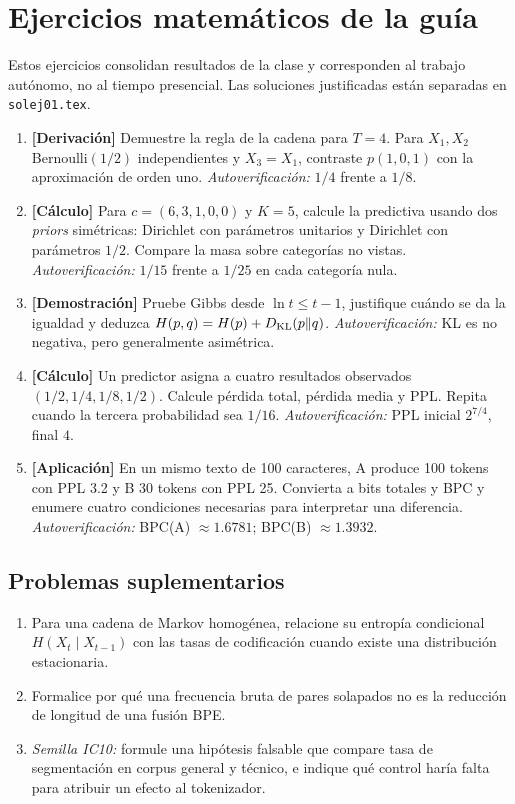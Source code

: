 \chapter*{Ejercicios matemáticos de la guía}
\noindent Estos ejercicios consolidan resultados de la clase y corresponden al
trabajo autónomo, no al tiempo presencial. Las soluciones justificadas están
separadas en \texttt{solej01.tex}.
\begin{enumerate}
\item \textbf{[Derivación]} Demuestre la regla de la cadena para $T=4$.
Para $X_1,X_2$ Bernoulli$(1/2)$ independientes y $X_3=X_1$,
contraste $p(1,0,1)$ con la aproximación de orden uno.
\emph{Autoverificación:} $1/4$ frente a $1/8$.
\item \textbf{[Cálculo]} Para $c=(6,3,1,0,0)$ y $K=5$,
calcule la predictiva usando dos \emph{priors} simétricas:
Dirichlet con parámetros unitarios y Dirichlet con parámetros $1/2$.
Compare la masa sobre categorías no vistas.
\emph{Autoverificación:} $1/15$ frente a $1/25$ en cada categoría nula.
\item \textbf{[Demostración]} Pruebe Gibbs desde $\ln t\le t-1$,
justifique cuándo se da la igualdad y deduzca
$H(p,q)=H(p)+D_{\rm KL}(p\|q)$.
\emph{Autoverificación:} KL es no negativa, pero generalmente asimétrica.
\item \textbf{[Cálculo]} Un predictor asigna a cuatro resultados observados
$(1/2,1/4,1/8,1/2)$. Calcule pérdida total, pérdida media y
PPL. Repita cuando la tercera probabilidad sea $1/16$.
\emph{Autoverificación:} PPL inicial $2^{7/4}$, final $4$.
\item \textbf{[Aplicación]} En un mismo texto de 100 caracteres, A
produce 100 tokens con PPL 3.2 y B 30 tokens con PPL 25.
Convierta a bits totales y BPC y enumere cuatro condiciones necesarias
para interpretar una diferencia.
\emph{Autoverificación:} BPC(A) $\approx1.6781$;
BPC(B) $\approx1.3932$.
\end{enumerate}
\section*{Problemas suplementarios}
\begin{enumerate}
\item[(S1.A)] Para una cadena de Markov homogénea, relacione su
entropía condicional $H(X_t\mid X_{t-1})$ con las tasas de
codificación cuando existe una distribución estacionaria.
\item[(S1.B)] Formalice por qué una frecuencia bruta de pares solapados
no es la reducción de longitud de una fusión BPE.
\item[(S1.C)] \emph{Semilla IC10:} formule una hipótesis falsable que
compare tasa de segmentación en corpus general y técnico, e indique
qué control haría falta para atribuir un efecto al tokenizador.
\end{enumerate}
